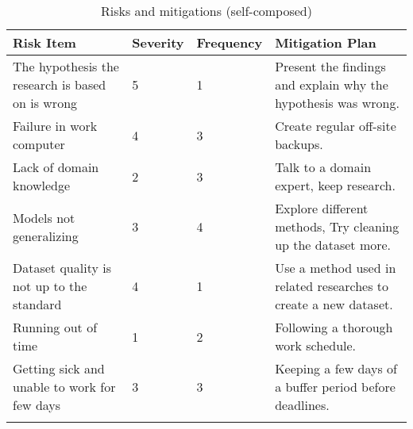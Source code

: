 \begin{longtable}{|p{4.8cm}|p{1.35cm}|p{1.8cm}|p{7cm}|}
    \hline
    \textbf{Risk Item} & 
    \textbf{Severity} & 
    \textbf{Frequency} & 
    \textbf{Mitigation Plan}
    \\ \hline
    
    The hypothesis the research is based on is wrong & 
    5 & 
    1 & 
    Present the findings and explain why the hypothesis was wrong.
    \\ \hline
    
    Failure in work computer & 
    4 & 
    3 & 
    Create regular off-site backups.
    \\ \hline
    
    Lack of domain knowledge & 
    2 & 
    3 & 
    Talk to a domain expert, keep research.
    \\ \hline
    
    Models not generalizing & 
    3 & 
    4 & 
    Explore different methods, Try cleaning up the dataset more.
    \\ \hline
    
    Dataset quality is not up to the standard & 
    4 & 
    1 & 
    Use a method used in related researches to create a new dataset.
    \\ \hline
    
    Running out of time & 
    1 & 
    2 & 
    Following a thorough work schedule.
    \\ \hline
    
    Getting sick and unable to work for few days & 
    3 & 
    3 & 
    Keeping a few days of a buffer period before deadlines.
    \\ \hline
    \caption{Risks and mitigations (self-composed)}
\end{longtable}